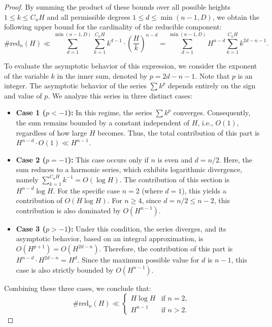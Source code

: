 \documentclass[10pt,a4paper]{amsart}
\begin{document}
\begin{proof}
By summing the product of these bounds over all possible heights $1 \le k \le C_n H$ and all permissible degrees $1 \le d \le \min(n-1, D)$, we obtain the following upper bound for the cardinality of the reducible component:
\begin{equation*}
    \#\mathrm{red}_n(H) \ll \sum_{d=1}^{\min(n-1, D)} \sum_{k=1}^{C_n H} k^{d-1} \cdot \left(\frac{H}{k}\right)^{n-d} = \sum_{d=1}^{\min(n-1, D)} H^{n-d} \sum_{k=1}^{C_n H} k^{2d-n-1}.
\end{equation*}

To evaluate the asymptotic behavior of this expression, we consider the exponent of the variable $k$ in the inner sum, denoted by $p = 2d - n - 1$. Note that $p$ is an integer. The asymptotic behavior of the series $\sum k^p$ depends entirely on the sign and value of $p$. We analyze this series in three distinct cases:

\begin{itemize}
    \item \textbf{Case 1 ($p < -1$):} In this regime, the series $\sum k^p$ converges. Consequently, the sum remains bounded by a constant independent of $H$, i.e., $O(1)$, regardless of how large $H$ becomes. Thus, the total contribution of this part is $H^{n-d} \cdot O(1) \ll H^{n-1}$.
    
    \item \textbf{Case 2 ($p = -1$):} This case occurs only if $n$ is even and $d = n/2$. Here, the sum reduces to a harmonic series, which exhibits logarithmic divergence, namely $\sum_{k=1}^{C_n H} k^{-1} = O(\log H)$. The contribution of this section is $H^{n-d}\log H$. For the specific case $n=2$ (where $d=1$), this yields a contribution of $O(H \log H)$. For $n \ge 4$, since $d = n/2 \le n-2$, this contribution is also dominated by $O(H^{n-1})$.
    
    \item \textbf{Case 3 ($p > -1$):} Under this condition, the series diverges, and its asymptotic behavior, based on an integral approximation, is $O(H^{p+1}) = O(H^{2d-n})$. Therefore, the contribution of this part is $H^{n-d} \cdot H^{2d-n} = H^d$. Since the maximum possible value for $d$ is $n-1$, this case is also strictly bounded by $O(H^{n-1})$.
\end{itemize}

Combining these three cases, we conclude that:
\begin{equation*}
    \#\mathrm{red}_n(H) \ll 
    \begin{cases} 
      H \log H & \text{if } n = 2, \\
      H^{n-1} & \text{if } n > 2.
    \end{cases}
\end{equation*}


\end{proof}
\end{document}
